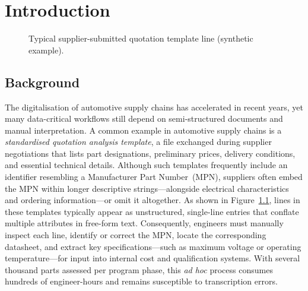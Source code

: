 \chapter{Introduction}\label{chapter:introduction}

\begin{figure}[H]
  \centering
  \caption{Typical supplier-submitted quotation template line (synthetic example).}
  \label{fig:standardised-quotation-analysis-template-line-example}
\end{figure}

\section{Background }
The digitalisation of automotive supply chains has accelerated in recent years, yet many data-critical workflows still depend on semi-structured documents and manual interpretation.  
A common example in automotive supply chains is a \emph{standardised quotation analysis template}, a file exchanged during supplier negotiations that lists part designations, preliminary prices, delivery conditions, and essential technical details.  
Although such templates frequently include an identifier resembling a Manufacturer Part Number~(MPN), suppliers often embed the MPN within longer descriptive strings—alongside electrical characteristics and ordering information—or omit it altogether.  
As shown in Figure~\ref{fig:standardised-quotation-analysis-template-line-example}, lines in these templates typically appear as unstructured, single-line entries that conflate multiple attributes in free-form text.  
Consequently, engineers must manually inspect each line, identify or correct the MPN, locate the corresponding datasheet, and extract key specifications—such as maximum voltage or operating temperature—for input into internal cost and qualification systems.  
With several thousand parts assessed per program phase, this \emph{ad hoc} process consumes hundreds of engineer-hours and remains susceptible to transcription errors.

